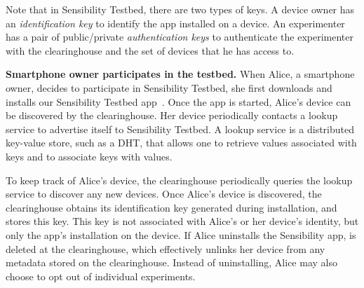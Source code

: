 Note that in Sensibility Testbed, there are two types of keys. A device
owner has an \textit{identification key} to identify the app installed on a 
device. An experimenter has a pair of public/private \textit{authentication 
keys} to authenticate the experimenter with the clearinghouse and 
the set of devices that he has access to.

\textbf{Smartphone owner participates in the testbed.}
When Alice, a smartphone owner, decides to participate in
Sensibility Testbed, she first downloads and installs our Sensibility Testbed
app~\cite{sensibility-app}. %
Once the app is started, Alice's device can be
discovered by the clearinghouse. Her device periodically contacts 
a lookup service to advertise itself to Sensibility Testbed. 
A lookup service is a distributed key-value store, such as a DHT, that 
allows one to retrieve values associated with keys and to associate 
keys with values. 

To keep track of Alice's device, the
clearinghouse periodically queries the lookup service to
discover any new devices. Once Alice's device is discovered, the
clearinghouse obtains its identification key  generated
during installation, and stores this key. 
This key is not associated with Alice's or her
device's identity, but only the app's installation on the device. If
Alice uninstalls the Sensibility app,  is
deleted at the clearinghouse, which effectively unlinks
her device from any metadata stored on the clearinghouse.
Instead of uninstalling, Alice may also choose to opt out of
individual experiments.


